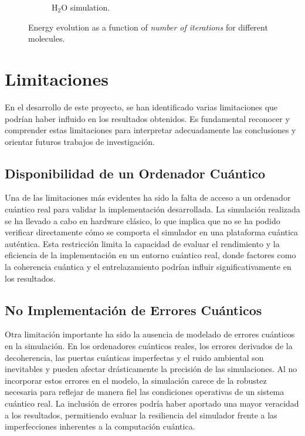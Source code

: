 \begin{figure}[H]
\begin{subfigure}{0.45\textwidth}
    \caption{H$_2$O simulation.}
    \label{fig:num_iterations_h2o}
  \end{subfigure}
  \caption{Energy evolution as a function of \textit{number of iterations} for different molecules.}
  \label{fig:num_iterations_results}
\end{figure}


\section{Limitaciones}
En el desarrollo de este proyecto, se han identificado varias limitaciones que podrían haber influido en los resultados obtenidos. Es fundamental reconocer y comprender estas limitaciones para interpretar adecuadamente las conclusiones y orientar futuros trabajos de investigación.

\subsection{Disponibilidad de un Ordenador Cuántico}
Una de las limitaciones más evidentes ha sido la falta de acceso a un ordenador cuántico real para validar la implementación desarrollada. La simulación realizada se ha llevado a cabo en hardware clásico, lo que implica que no se ha podido verificar directamente cómo se comporta el simulador en una plataforma cuántica auténtica. Esta restricción limita la capacidad de evaluar el rendimiento y la eficiencia de la implementación en un entorno cuántico real, donde factores como la coherencia cuántica y el entrelazamiento podrían influir significativamente en los resultados.

\subsection{No Implementación de Errores Cuánticos}
Otra limitación importante ha sido la ausencia de modelado de errores cuánticos en la simulación. En los ordenadores cuánticos reales, los errores derivados de la decoherencia, las puertas cuánticas imperfectas y el ruido ambiental son inevitables y pueden afectar drásticamente la precisión de las simulaciones. Al no incorporar estos errores en el modelo, la simulación carece de la robustez necesaria para reflejar de manera fiel las condiciones operativas de un sistema cuántico real. La inclusión de errores podría haber aportado una mayor veracidad a los resultados, permitiendo evaluar la resiliencia del simulador frente a las imperfecciones inherentes a la computación cuántica.


